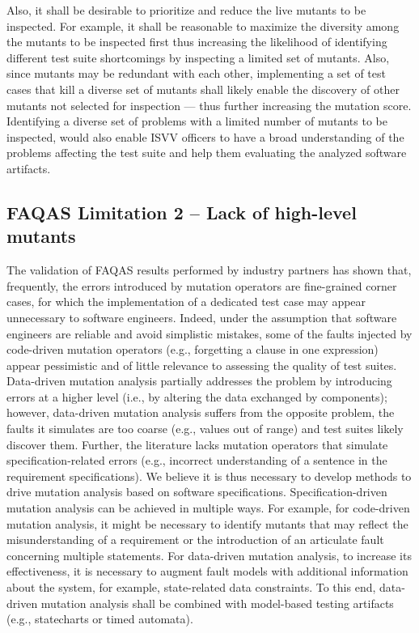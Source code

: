 Also, it shall be desirable to prioritize and reduce the live mutants to be inspected. For example, it shall be reasonable to maximize the diversity among the mutants to be inspected first thus increasing the likelihood of identifying different test suite shortcomings by inspecting a limited set of mutants. Also, since mutants may be redundant with each other, implementing a set of test cases that kill a diverse set of mutants shall likely enable the discovery of other mutants not selected for inspection --- thus further increasing the mutation score. Identifying a diverse set of problems with a limited number of mutants to be inspected, would also enable ISVV officers to have a broad understanding of the problems affecting the test suite and help them evaluating the analyzed software artifacts.
%
\subsection{FAQAS Limitation 2 – Lack of high-level mutants}

The validation of FAQAS results performed by industry partners has shown that, frequently, the errors introduced by mutation operators are fine-grained corner cases, for which the implementation of a dedicated test case may appear unnecessary to software engineers. 
Indeed, under the assumption that software engineers are reliable and avoid simplistic mistakes, some of the faults injected by code-driven mutation operators (e.g., forgetting a clause in one expression) appear pessimistic and of little relevance to assessing the quality of test suites. 
Data-driven mutation analysis partially addresses the problem by introducing errors at a higher level (i.e., by altering the data exchanged by components); however, data-driven mutation analysis suffers from the opposite problem, the faults it simulates are too coarse (e.g., values out of range) and test suites likely discover them. Further, the literature lacks mutation operators that simulate specification-related errors (e.g., incorrect understanding of a sentence in the requirement specifications). We believe it is thus necessary to develop methods to drive mutation analysis based on software specifications. Specification-driven mutation analysis can be achieved in multiple ways. For example, for code-driven mutation analysis, it might be necessary to identify mutants that may reflect the misunderstanding of a requirement or the introduction of an articulate fault concerning multiple statements. For data-driven mutation analysis, to increase its effectiveness, it is necessary to augment fault models with additional information about the system, for example, state-related data constraints. To this end, data-driven mutation analysis shall be combined with model-based testing artifacts (e.g., statecharts or timed automata).

